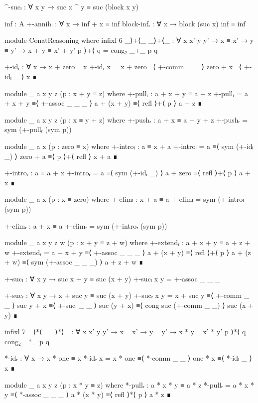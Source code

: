 \begin{code}[hide]
    ^-sucₗ : ∀ x y → suc x ^ y ≡ suc (block x y)

    inf : A
    +-annihₗ : ∀ x → inf + x ≡ inf
    block-infᵣ : ∀ x → block (suc x) inf ≡ inf

  module ConatReasoning where
    infixl 6 _⟩+⟨_
    _⟩+⟨_ : ∀ {x x' y y'} → x ≡ x' → y ≡ y' → x + y ≡ x' + y'
    p ⟩+⟨ q = cong₂ _+_ p q

    +-idᵣ : ∀ x → x + zero ≡ x
    +-idᵣ x =
      x + zero ≡⟨ +-comm _ _ ⟩
      zero + x ≡⟨ +-idₗ _ ⟩
      x        ∎

    module _ {a x y z} (p : x + y ≡ z) where
      +-pullᵣ : a + x + y ≡ a + z
      +-pullᵣ =
        a + x + y   ≡⟨ +-assoc _ _ _ ⟩
        a + (x + y) ≡⟨ refl ⟩+⟨ p ⟩
        a + z       ∎

    module _ {a x y z} (p : x ≡ y + z) where
      +-pushᵣ : a + x ≡ a + y + z
      +-pushᵣ = sym (+-pullᵣ (sym p))

    module _ {a x} (p : zero ≡ x) where
      +-introₗ : a ≡ x + a
      +-introₗ =
        a        ≡⟨ sym (+-idₗ _) ⟩
        zero + a ≡⟨ p ⟩+⟨ refl ⟩
        x + a    ∎

      +-introᵣ : a ≡ a + x
      +-introᵣ =
        a        ≡⟨ sym (+-idᵣ _) ⟩
        a + zero ≡⟨ refl ⟩+⟨ p ⟩
        a + x    ∎

    module _ {a x} (p : x ≡ zero) where
      +-elimₗ : x + a ≡ a
      +-elimₗ = sym (+-introₗ (sym p))

      +-elimᵣ : a + x ≡ a
      +-elimᵣ = sym (+-introᵣ (sym p))

    module _ {a x y z w} (p : x + y ≡ z + w) where
      +-extendᵣ : a + x + y ≡ a + z + w
      +-extendᵣ =
        a + x + y   ≡⟨ +-assoc _ _ _ ⟩
        a + (x + y) ≡⟨ refl ⟩+⟨ p ⟩
        a + (z + w) ≡⟨ sym (+-assoc _ _ _) ⟩
        a + z + w   ∎

    +-sucₗ : ∀ x y → suc x + y ≡ suc (x + y)
    +-sucₗ x y = +-assoc _ _ _

    +-sucᵣ : ∀ x y → x + suc y ≡ suc (x + y)
    +-sucᵣ x y =
      x + suc y   ≡⟨ +-comm _ _ ⟩
      suc y + x   ≡⟨ +-sucₗ _ _ ⟩
      suc (y + x) ≡⟨ cong suc (+-comm _ _) ⟩
      suc (x + y) ∎

    infixl 7 _⟩*⟨_
    _⟩*⟨_ : ∀ {x x' y y'} → x ≡ x' → y ≡ y' → x * y ≡ x' * y'
    p ⟩*⟨ q = cong₂ _*_ p q

    *-idᵣ : ∀ x → x * one ≡ x
    *-idᵣ x =
      x * one ≡⟨ *-comm _ _ ⟩
      one * x ≡⟨ *-idₗ _ ⟩
      x       ∎

    module _ {a x y z} (p : x * y ≡ z) where
      *-pullᵣ : a * x * y ≡ a * z
      *-pullᵣ =
        a * x * y   ≡⟨ *-assoc _ _ _ ⟩
        a * (x * y) ≡⟨ refl ⟩*⟨ p ⟩
        a * z       ∎


\end{code}
